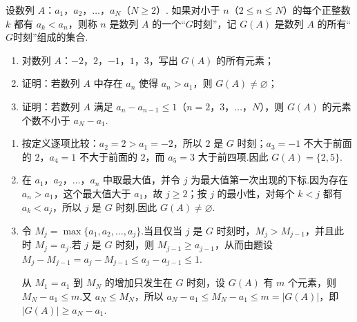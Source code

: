 \begin{problem}
设数列 \(A\)：\(a_1\)，\(a_2\)，\(\ldots\)，\(a_N\)（\(N\ge2\)）. 如果对小于 \(n\)（\(2\le n\le N\)）的每个正整数 \(k\) 都有 \(a_k<a_n\)，则称 \(n\) 是数列 \(A\) 的一个“\(G\)时刻”，记 \(G(A)\) 是数列 \(A\) 的所有“\(G\)时刻”组成的集合.

\begin{enumerate}
\item 对数列 \(A\)：\(-2\)，\(2\)，\(-1\)，\(1\)，\(3\)，写出 \(G(A)\) 的所有元素；
\item 证明：若数列 \(A\) 中存在 \(a_n\) 使得 \(a_n>a_1\)，则 \(G(A)\ne\varnothing\)；
\item 证明：若数列 \(A\) 满足 \(a_n-a_{n-1}\le1\)（\(n=2\)，\(3\)，\(\ldots\)，\(N\)），则 \(G(A)\) 的元素个数不小于 \(a_N-a_1\).
\end{enumerate}
\end{problem}

\begin{solution}
\begin{enumerate}
\item 按定义逐项比较：\(a_2=2>a_1=-2\)，所以 \(2\) 是 \(G\) 时刻；\(a_3=-1\) 不大于前面的 \(2\)，\(a_4=1\) 不大于前面的 \(2\)，而 \(a_5=3\) 大于前四项.因此 \(G(A)=\{2,5\}\).
\item 在 \(a_1\)，\(a_2\)，\(\ldots\)，\(a_n\) 中取最大值，并令 \(j\) 为最大值第一次出现的下标.因为存在 \(a_n>a_1\)，这个最大值大于 \(a_1\)，故 \(j\ge2\)；按 \(j\) 的最小性，对每个 \(k<j\) 都有 \(a_k<a_j\)，所以 \(j\) 是 \(G\) 时刻.因此 \(G(A)\ne\varnothing\).
\item 令 \(M_j=\max\{a_1,a_2,\ldots,a_j\}\).当且仅当 \(j\) 是 \(G\) 时刻时，\(M_j>M_{j-1}\)，并且此时 \(M_j=a_j\).若 \(j\) 是 \(G\) 时刻，则 \(M_{j-1}\ge a_{j-1}\)，从而由题设
\(M_j-M_{j-1}=a_j-M_{j-1}\le a_j-a_{j-1}\le1\).

从 \(M_1=a_1\) 到 \(M_N\) 的增加只发生在 \(G\) 时刻，设 \(G(A)\) 有 \(m\) 个元素，则 \(M_N-a_1\le m\).又 \(a_N\le M_N\)，所以
\(a_N-a_1\le M_N-a_1\le m=|G(A)|\)，即 \(|G(A)|\ge a_N-a_1\).
\end{enumerate}
\end{solution}
